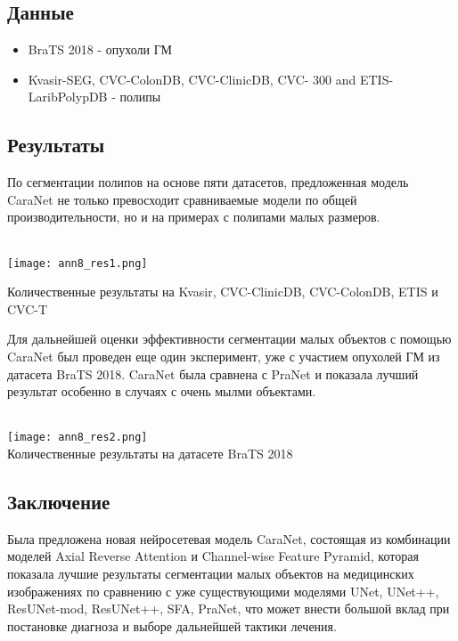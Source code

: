 \subsection*{Данные}
\begin{itemize}
    \item BraTS 2018 - опухоли ГМ
    \item Kvasir-SEG, CVC-ColonDB, CVC-ClinicDB, CVC-
    300 and ETIS-LaribPolypDB - полипы
\end{itemize}
 
\subsection*{Результаты}
По сегментации полипов на основе пяти датасетов, предложенная модель CaraNet не только 
превосходит сравниваемые модели по общей производительности, но и на примерах с полипами 
малых размеров. \\
\\
\begin{minipage}{1.0\linewidth}
    \begin{center}
        \texttt{[image: ann8\_res1.png]}
        \caption{\scriptsize{Количественные результаты на Kvasir, CVC-ClinicDB, CVC-ColonDB, ETIS и CVC-T}}
    \end{center}
\end{minipage}

Для дальнейшей оценки эффективности сегментации малых объектов с помощью CaraNet был 
проведен еще один эксперимент, уже с участием опухолей ГМ из датасета BraTS 2018. CaraNet 
была сравнена с PraNet и показала лучший результат особенно в случаях с очень мылми объектами. \\
\\
\begin{minipage}{1.0\linewidth}
    \begin{center}
        \texttt{[image: ann8\_res2.png]} \\
        \caption{\scriptsize{Количественные результаты на датасете BraTS 2018}}
    \end{center}
    
\end{minipage}



\subsection*{Заключение}
Была предложена новая нейросетевая модель CaraNet, состоящая из комбинации моделей 
Axial Reverse Attention и Channel-wise Feature Pyramid, которая показала 
лучшие результаты сегментации малых объектов на медицинских изображениях по сравнению с уже существующими моделями 
UNet, UNet++, ResUNet-mod, ResUNet++, SFA, PraNet, что может внести большой вклад 
при постановке диагноза и выборе дальнейшей тактики лечения.